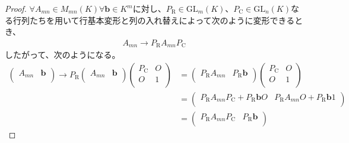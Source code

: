 \documentclass[dvipdfmx]{jsarticle}
\begin{document}
\begin{proof}
$\forall A_{mn} \in M_{mn}(K)\forall\mathbf{b} \in K^{m}$に対し、$P_{\mathrm{R}} \in {\mathrm{GL}}_{m}(K)$、$P_{\mathrm{C}} \in {\mathrm{GL}}_{n}(K)$なる行列たちを用いて行基本変形と列の入れ替えによって次のように変形できるとき、
\begin{align*}
A_{mn} \rightarrow P_{\mathrm{R}}A_{mn}P_{\mathrm{C}}
\end{align*}
したがって、次のようになる。
\begin{align*}
\begin{pmatrix}
A_{mn} & \mathbf{b} \\
\end{pmatrix} \rightarrow P_{\mathrm{R}}\begin{pmatrix}
A_{mn} & \mathbf{b} \\
\end{pmatrix}\begin{pmatrix}
P_{\mathrm{C}} & O \\
O & 1 \\
\end{pmatrix} &= \begin{pmatrix}
P_{\mathrm{R}}A_{mn} & P_{\mathrm{R}}\mathbf{b} \\
\end{pmatrix}\begin{pmatrix}
P_{\mathrm{C}} & O \\
O & 1 \\
\end{pmatrix}\\
&= \begin{pmatrix}
P_{\mathrm{R}}A_{mn}P_{\mathrm{C}} + P_{\mathrm{R}}\mathbf{b}O & P_{\mathrm{R}}A_{mn}O + P_{\mathrm{R}}\mathbf{b}1 \\
\end{pmatrix}\\
&= \begin{pmatrix}
P_{\mathrm{R}}A_{mn}P_{\mathrm{C}} & P_{\mathrm{R}}\mathbf{b} \\
\end{pmatrix}
\end{align*}
\end{proof}
\end{document}

